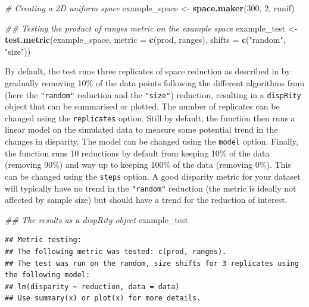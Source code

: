 \documentclass[]{book}
\newenvironment{Shaded}{\begin{snugshade}}{\end{snugshade}}
\newcommand{\CommentTok}[1]{\textcolor[rgb]{0.56,0.35,0.01}{\textit{#1}}}
\newcommand{\DataTypeTok}[1]{\textcolor[rgb]{0.13,0.29,0.53}{#1}}
\newcommand{\DecValTok}[1]{\textcolor[rgb]{0.00,0.00,0.81}{#1}}
\newcommand{\KeywordTok}[1]{\textcolor[rgb]{0.13,0.29,0.53}{\textbf{#1}}}
\newcommand{\NormalTok}[1]{#1}
\newcommand{\StringTok}[1]{\textcolor[rgb]{0.31,0.60,0.02}{#1}}
\begin{document}
\begin{Shaded}
\begin{Highlighting}[]
\CommentTok{# Creating a 2D uniform space}
\NormalTok{example_space <-}\StringTok{ }\KeywordTok{space.maker}\NormalTok{(}\DecValTok{300}\NormalTok{, }\DecValTok{2}\NormalTok{, runif)}

\CommentTok{## Testing the product of ranges metric on the example space}
\NormalTok{example_test <-}\StringTok{ }\KeywordTok{test.metric}\NormalTok{(example_space, }\DataTypeTok{metric =} \KeywordTok{c}\NormalTok{(prod, ranges),}
                           \DataTypeTok{shifts =} \KeywordTok{c}\NormalTok{(}\StringTok{"random"}\NormalTok{, }\StringTok{"size"}\NormalTok{)) }
\end{Highlighting}
\end{Shaded}

By default, the test runs three replicates of space reduction as described in \citet{moms} by gradually removing 10\% of the data points following the different algorithms from \citet{moms} (here the \texttt{"random"} reduction and the \texttt{"size"}) reduction, resulting in a \texttt{dispRity} object that can be summarised or plotted.
The number of replicates can be changed using the \texttt{replicates} option.
Still by default, the function then runs a linear model on the simulated data to measure some potential trend in the changes in disparity.
The model can be changed using the \texttt{model} option.
Finally, the function runs 10 reductions by default from keeping 10\% of the data (removing 90\%) and way up to keeping 100\% of the data (removing 0\%).
This can be changed using the \texttt{steps} option.
A good disparity metric for your dataset will typically have no trend in the \texttt{"random"} reduction (the metric is ideally not affected by sample size) but should have a trend for the reduction of interest.

\begin{Shaded}
\begin{Highlighting}[]
\CommentTok{## The results as a dispRity object}
\NormalTok{example_test}
\end{Highlighting}
\end{Shaded}

\begin{verbatim}
## Metric testing:
## The following metric was tested: c(prod, ranges).
## The test was run on the random, size shifts for 3 replicates using the following model:
## lm(disparity ~ reduction, data = data)
## Use summary(x) or plot(x) for more details.
\end{verbatim}
\end{document}
